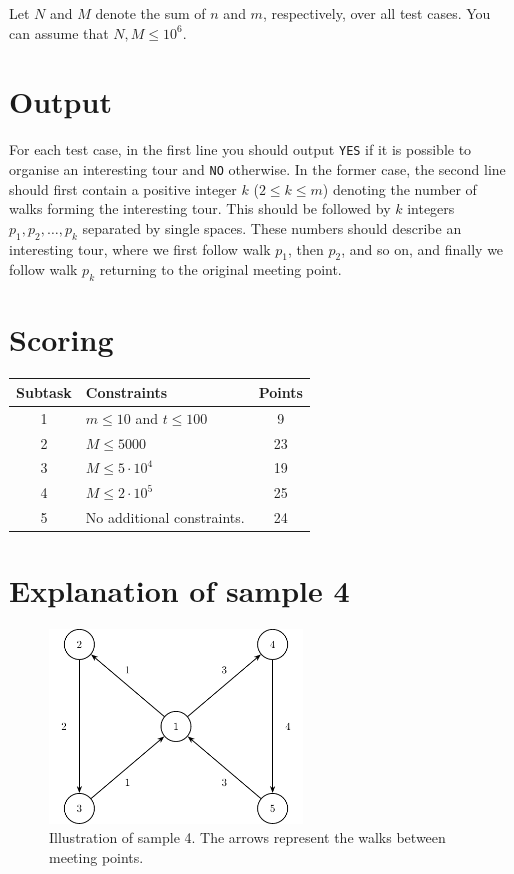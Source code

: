 Let $N$ and $M$ denote the sum of $n$ and $m$, respectively, over all test cases. You can assume that $N, M \leq 10^{6}$.

\section*{Output}
For each test case, in the first line you should output \texttt{YES} if it is possible to organise an interesting tour
and \texttt{NO} otherwise. In the former case, the second line should first contain a positive integer $k$ ($2\leq k\leq m$) denoting
the number of walks forming the interesting tour. This should be followed by $k$ integers
$p_{1}, p_{2}, \ldots, p_{k}$
separated by single spaces. These numbers should describe an interesting tour, where we first follow walk
$p_{1}$, then $p_{2}$, and so on, and finally we follow walk $p_{k}$ returning to the original meeting point.

\section*{Scoring}
\begin{center}
\begin{tabular}{|c|p{13cm}|c|}
\hline
\textbf{Subtask} & \textbf{Constraints} & \textbf{Points} \\\hline
1 & $m \leq 10$ and $t \leq 100$ & 9 \\\hline
2 & $M \leq 5000$ & 23 \\\hline
3 & $M \leq 5 \cdot 10^{4}$ & 19 \\\hline
4 & $M \leq 2 \cdot 10^{5}$ & 25 \\\hline
5 & No additional constraints. & 24 \\\hline
\end{tabular}
\end{center}

\section*{Explanation of sample 4}
\begin{figure}[h!]
    \centering
    \includegraphics[width=0.6\textwidth]{sample.pdf}
    \caption{Illustration of sample 4. The arrows represent the walks between meeting points.}
\end{figure}
